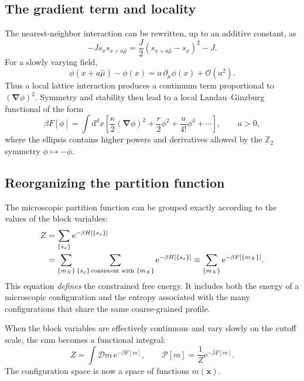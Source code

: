 \documentclass[11pt]{article}
\newcommand{\dd}{\mathrm{d}}
\newcommand{\e}{\mathrm{e}}
\newcommand{\cD}{\mathcal{D}}
\newcommand{\cO}{\mathcal{O}}
\begin{document}
\subsection{The gradient term and locality}

The nearest-neighbor interaction can be rewritten, up to an additive
constant, as
\begin{equation}
  -J s_xs_{x+a\hat\mu}
  =\frac{J}{2}\left(s_{x+a\hat\mu}-s_x\right)^2-J.
  \label{eq:discretegradient}
\end{equation}
For a slowly varying field,
\begin{equation}
  \phi(x+a\hat\mu)-\phi(x)
  =a\,\partial_\mu\phi(x)+\cO(a^2).
\end{equation}
Thus a local lattice interaction produces a continuum term proportional to
$(\bm\nabla\phi)^2$.  Symmetry and stability then lead to a local
Landau--Ginzburg functional of the form
\begin{equation}
  \beta F[\phi]
  =\int\dd^dx\left[
    \frac{\kappa}{2}(\bm\nabla\phi)^2
    +\frac{r}{2}\phi^2
    +\frac{u}{4!}\phi^4+\cdots
  \right],
  \qquad u>0,
  \label{eq:LG2}
\end{equation}
where the ellipsis contains higher powers and derivatives allowed by the
$\mathbb Z_2$ symmetry $\phi\mapsto-\phi$.

\subsection{Reorganizing the partition function}

The microscopic partition function can be grouped exactly according to the
values of the block variables:
\begin{align}
  Z
  &=\sum_{\{s_x\}}\e^{-\beta H[\{s_x\}]}
  \notag\\
  &=\sum_{\{m_X\}}
    \sum_{\{s_x\}\,\text{consistent with }\{m_X\}}
    \e^{-\beta H[\{s_x\}]}
  \equiv
  \sum_{\{m_X\}}\e^{-\beta F[\{m_X\}]}.
  \label{eq:constrainedF2}
\end{align}
This equation \emph{defines} the constrained free energy.  It includes both
the energy of a microscopic configuration and the entropy associated with
the many configurations that share the same coarse-grained profile.

When the block variables are effectively continuous and vary slowly on the
cutoff scale, the sum becomes a functional integral:
\begin{equation}
  \boxed{
  Z=\int\cD m\,\e^{-\beta F[m]},
  \qquad
  \mathcal P[m]=\frac{1}{Z}\e^{-\beta F[m]}.
  }
  \label{eq:statpath}
\end{equation}
The configuration space is now a space of functions $m(\bm x)$.
\end{document}
